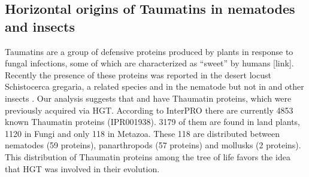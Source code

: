 \subsection{Horizontal origins of Taumatins in nematodes and insects}
Taumatins are a group of defensive proteins produced by plants in response to
fungal infections, some of which are characterized as “sweet” by humans [link].
Recently the presence of these proteins was reported in the desert locust
Schistocerca gregaria, a related species  and in the
nematode  but not in  and other insects
\cite{Brandazza2004}. Our analysis suggests that 
and  have Thaumatin proteins, which were
previously acquired via HGT. According to InterPRO \cite{Finn2017} there are
currently 4853 known Thaumatin proteins (IPR001938). 3179 of them are found in
land plants, 1120 in Fungi and only 118 in Metazoa. These 118 are distributed
between nematodes (59 proteins), panarthropods (57 proteins) and mollusks (2
proteins). This distribution of Thaumatin proteins among the tree of life
favors the idea that HGT was involved in their evolution.

